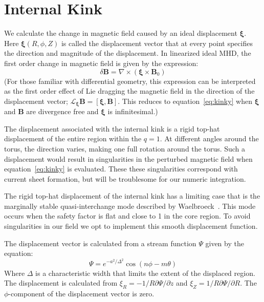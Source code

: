 \documentclass[%
superscriptaddress,
amsmath,amssymb,
aps,
pre,
floatfix,
]{revtex4-2}
\begin{document}
\section*{Internal Kink}
We calculate the change in magnetic field caused by an ideal displacement $\boldsymbol{\xi}$. 
Here $\boldsymbol{\xi}(R, \phi, Z)$ is called the displacement vector that at every point specifies the direction and magnitude of the displacement. 
In linearized ideal MHD, the first order change in magnetic field is given by the expression: 
\begin{equation}\label{eq:kinky}
    \delta \mathbf{B} = \nabla \times (\boldsymbol{\xi} \times \mathbf{B}_0)
\end{equation}
(For those familiar with differential geometry, this expression can be interpreted as the first order effect of Lie dragging the magnetic field in the direction of the displacement vector; $\mathcal{L}_{\boldsymbol{\xi}} \mathbf{B} = \left[\boldsymbol{\xi}, \mathbf{B}\right]$. This reduces to equation~\eqref{eq:kinky} when $\boldsymbol{\xi}$ and $\mathbf{B}$ are divergence free and $\boldsymbol{\xi}$ is infinitesimal.)

The displacement associated with the internal kink is a rigid top-hat displacement of the entire region within the $q=1$. 
At different angles around the torus, the direction varies, making one full rotation around the torus. 
Such a displacement would result in singularities in the perturbed magnetic field when equation~\eqref{eq:kinky} is evaluated. 
These these singularities correspond with current sheet formation, but will be troublesome for our numeric integration.

The rigid top-hat displacement of the internal kink has a limiting case that is the marginally stable quasi-interchange mode described by Waelbroeck~\cite{waelbroeck1989nonlinear}. 
This mode occurs when the safety factor is flat and close to 1 in the core region. 
To avoid singularities in our field we opt to implement this smooth displacement function. 

The displacement vector is calculated from a stream function $\Psi$ given by the equation: 
\begin{equation}
    \Psi = e^{-a^2/\Delta^2}\cos(n \phi - m \theta)
\end{equation}
Where $\Delta$ is a characteristic width that limits the extent of the displaced region. 
The displacement is calculated from $\xi_R= -1/R \partial \Psi/\partial z$ and $\xi_Z= 1/R \partial \Psi/\partial R$. 
The $\phi$-component of the displacement vector is zero. 
\end{document}
